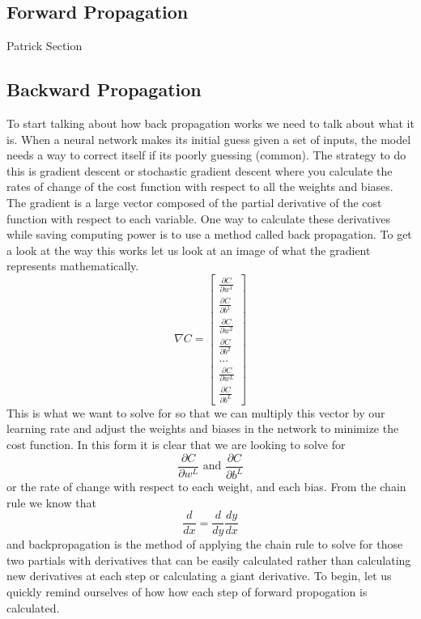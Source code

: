 \documentclass[]{article}
\begin{document}
\subsection{Forward Propagation}
Patrick Section
\subsection{Backward Propagation}
To start talking about how back propagation works we need to talk about what it is. When a neural network makes its initial guess given a set of inputs, the model needs a way to correct itself if its poorly guessing (common). The strategy to do this is gradient descent or stochastic gradient descent where you calculate the rates of change of the cost function with respect to all the weights and biases. The gradient is a large vector composed of the partial derivative of the cost function with respect to each variable. One way to calculate these derivatives while saving computing power is to use a method called back propagation. To get a look at the way this works let us look at an image of what the gradient represents mathematically. 
\begin{equation}
    \nabla C = \begin{bmatrix}\frac{\partial C}{\partial w^1}\\\frac{\partial C}{\partial b^1}\\\frac{\partial C}{\partial w^2}\\\frac{\partial C}{\partial b^2}\\...\\\frac{\partial C}{\partial w^L}\\\frac{\partial C}{\partial b^L}\label{gradient
    }\end{bmatrix}
\end{equation}
This is what we want to solve for so that we can multiply this vector by our learning rate and adjust the weights and biases in the network to minimize the cost function. In this form it is clear that we are looking to solve for \[\frac{\partial C}{\partial w^L} \text{ and }\frac{\partial C}{\partial b^L}\] or the rate of change with respect to each weight, and each bias. From the chain rule we know that 
\[\frac{d}{dx} = \frac{d}{dy}\frac{dy}{dx}\]
and backpropagation is the method of applying the chain rule to solve for those two partials with derivatives that can be easily calculated rather than calculating new derivatives at each step or calculating a giant derivative. To begin, let us quickly remind ourselves of how how each step of forward propogation is calculated.
\end{document}
